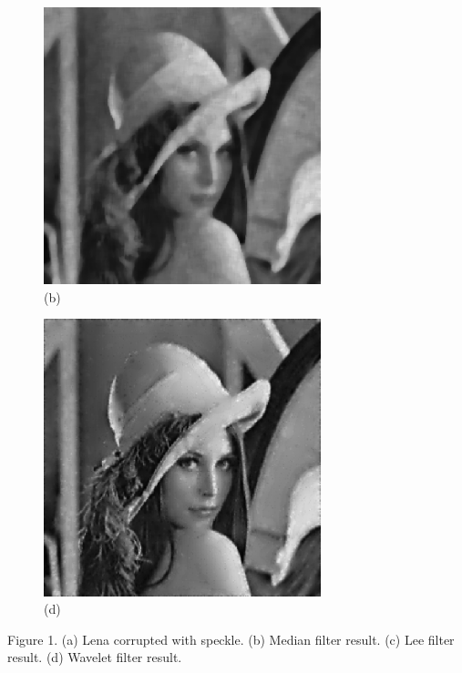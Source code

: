 \documentclass[twocolumn]{article}
\begin{document}
\begin{figure}[h]
	\begin{minipage}[h]{8.3cm} {\begin{center} \includegraphics[height=8.05cm,width=8.05cm]{../../pics/lena_med7.ps} \\(b) \end{center}} \end{minipage}
	\hspace{1.2cm}
	\begin{minipage}[h]{8.3cm} {\begin{center} \includegraphics[height=8.05cm,width=8.05cm]{../../pics/lena_yu_1.165n.ps} \\(d) \end{center}} \end{minipage}
\end{figure}
\begin{minipage}[h]{16.6cm}
	{\begin{center} Figure 1. (a) Lena corrupted with speckle. (b) Median filter result. (c) Lee filter result. (d) Wavelet filter result. \end{center}}
\end{minipage}
\end{document}
